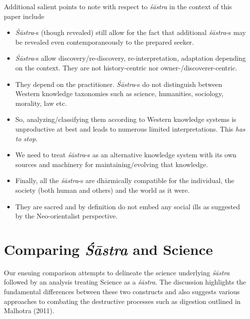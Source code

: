 Additional salient points to note with respect to \textit{śāstra} in the context of this paper include
\begin{itemize}[topsep=1pt]
\itemsep=2pt
\item \textit{Śāstra}-s (though revealed) still allow for the fact that additional \textit{śāstra}-s may be revealed even contemporaneously to the prepared seeker.

 \item \textit{Śāstra}-s allow discovery/re-discovery, re-interpretation, adaptation depending on the context. They are not history-centric nor owner-/discoverer-centric. 

\newpage

 \item They depend on the practitioner. \textit{Śāstra}-s do not distinguish between Western knowledge taxonomies such as science, humanities, sociology, morality, law etc.

 \item So, analyzing/classifying them according to Western knowledge systems is unproductive at best and leads to numerous limited interpretations. This \textit{has to stop.}

 \item We need to treat \textit{śāstra}-s as an alternative knowledge system with its own sources and machinery for maintaining/evolving that knowledge.

 \item Finally, all the \textit{śāstra}-s are dhārmically compatible for the individual, the society (both human and others) and the world as it were.

 \item They are sacred and by definition do not embed any social ills as suggested by the Neo-orientalist perspective.

\end{itemize}


\section*{Comparing \textit{Śāstra} and Science}

Our ensuing comparison attempts to delineate the science underlying \textit{śāstra} followed by an analysis treating Science as a \textit{śāstra}. The discussion highlights the fundamental differences between these two constructs and also suggests various approaches to combating the destructive processes such as digestion outlined in Malhotra (2011).


